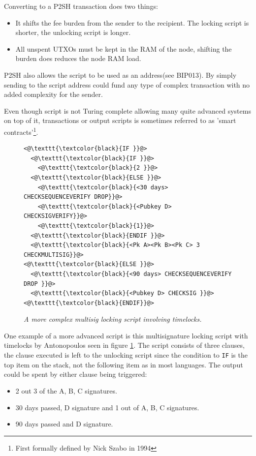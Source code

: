 Converting to a P2SH transaction does two things:

\begin{itemize}

	\item It shifts the fee burden from the sender to the recipient. The locking script is shorter, the unlocking script is longer.
	
	\item All unspent UTXOs must be kept in the RAM of the node, shifting the burden does reduces the node RAM load. 
	
\end{itemize}

P2SH also allows the script to be used as an address(see BIP013\cite{bip:0013:p2shaddr}). By simply sending to the script address could fund any type of complex transaction with no added complexity for the sender.

Even though script is not Turing complete allowing many quite advanced systems on top of it, transactions or output scripts is sometimes referred to as 'smart contracts'\footnote{First formally defined by Nick Szabo in 1994\cite{szabo:smart:contracts}}.

\begin{figure}[hbt!]
	
	\begin{lstlisting}	
<@\texttt{\textcolor{black}{IF }}@>
  <@\texttt{\textcolor{black}{IF }}@>
    <@\texttt{\textcolor{black}{2 }}@>
  <@\texttt{\textcolor{black}{ELSE }}@>
    <@\texttt{\textcolor{black}{<30 days> CHECKSEQUENCEVERIFY DROP}}@>
    <@\texttt{\textcolor{black}{<Pubkey D> CHECKSIGVERIFY}}@>
    <@\texttt{\textcolor{black}{1}}@>
  <@\texttt{\textcolor{black}{ENDIF }}@>
  <@\texttt{\textcolor{black}{<Pk A><Pk B><Pk C> 3 CHECKMULTISIG}}@>
<@\texttt{\textcolor{black}{ELSE }}@>
  <@\texttt{\textcolor{black}{<90 days> CHECKSEQUENCEVERIFY DROP }}@>
  <@\texttt{\textcolor{black}{<Pubkey D> CHECKSIG }}@>
<@\texttt{\textcolor{black}{ENDIF}}@>

	\end{lstlisting}
	
	\caption{\textit{ A more complex multisig locking script involving timelocks.
	}}
	\label{fig:aantop:multi}
\end{figure}

One example of a more advanced script is this multisignature locking script with timelocks by Antonopoulos seen in figure \ref{fig:aantop:multi}\cite{antonopoulos:bitcoin:scripting}. The script consists of three clauses, the clause executed is left to the unlocking script since the condition to \texttt{IF} is the top item on the stack, not the following item as in most languages. The output could be spent by either clause being triggered:
\begin{itemize}
	\item 2 out 3 of the A, B, C signatures.
	\item 30 days passed, D signature and 1 out of A, B, C signatures.
	\item 90 days passed and D signature.
\end{itemize}

